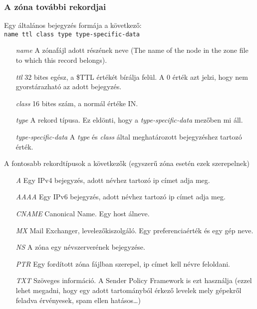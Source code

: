 \documentclass[fleqn,10pt,a4paper]{article}
\theoremstyle{magyar}
\begin{document}
  \subsubsection{A zóna további rekordjai}
  Egy általános bejegyzés formája a következő:\\
  \texttt{name\hspace{0.5cm} ttl \hspace{0.5cm}class\hspace{0.5cm} type\hspace{0.5cm} type-specific-data}
  \begin{itemize}
  \item[ {\it name}] A zónafájl adott részének neve (The name of the node in the zone file to which this record
    belongs).
  \item[ {\it ttl}] 32 bites egész, a \$TTL értékét bírálja felül. A $0$ érték azt jelzi, hogy nem gyorstárazható az
    adott bejegyzés.
  \item[ \textit{class}] 16 bites szám, a normál értéke IN.
  \item[ \textit{type}] A rekord típusa. Ez eldönti, hogy a \textit{type-specific-data} mezőben mi áll.
  \item[ \textit{type-specific-data}] A \emph{type} és \emph{class} által meghatározott bejegyzéshez tartozó érték.
  \end{itemize}
  
  A fontosabb rekordtípusok a következők (egyszerű zóna esetén ezek szerepelnek)
  
  \begin{itemize}
  \item[ \textit{A}] Egy IPv4 bejegyzés, adott névhez tartozó ip címet adja meg.
  \item[ \textit{AAAA}] Egy IPv6 bejegyzés, adott névhez tartozó ip címet adja meg.
  \item[ \textit{CNAME}] Canonical Name. Egy host álneve.
  \item[ \textit{MX}] Mail Exchanger, levelezőkiszolgáló. Egy preferenciaérték és egy gép neve.
  \item[ \textit{NS}] A zóna egy névszerverének bejegyzése.
  \item[ \textit{PTR}] Egy fordított zóna fájlban szerepel, ip címet kell névre feloldani.
  \item[ \textit{TXT}] Szöveges információ. A Sender Policy Framework is ezt használja (ezzel lehet megadni, hogy egy
    adott tartományból érkező levelek mely gépekről feladva érvényesek, spam ellen hatásos\ldots)
  \end{itemize}
  
\end{document}
